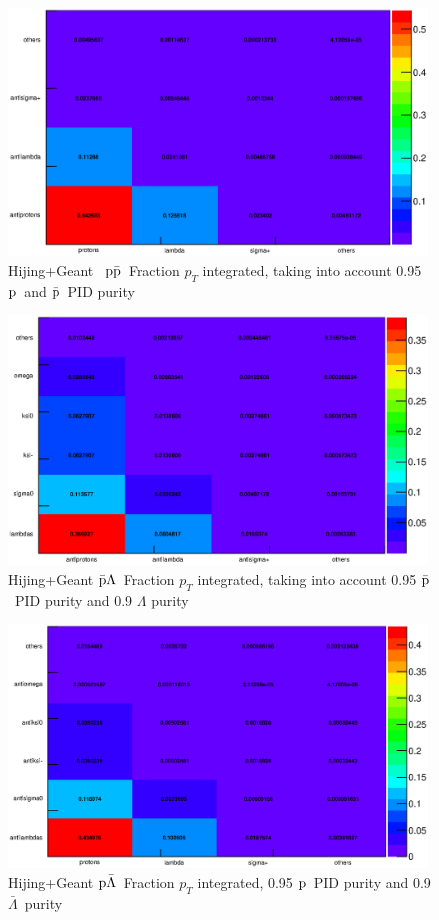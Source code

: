 \documentclass[ALICE,manyauthors]{ALICE_analysis_notes}
\newcommand{\pap}{$\rm p\bar{\rm p}$}
\newcommand{\pal}{$\rm p\bar{\rm \Lambda}$}
\newcommand{\apl}{$\bar{\rm p }\Lambda$}
\newcommand{\ap}{$\bar{\rm p }$}
\newcommand{\p}{$\rm p $}
\newcommand{\aL}{$\bar{\Lambda}$}
\begin{document}
 \begin{figure}[h!]
   \centering
   \includegraphics[width=0.99\textwidth]{pics/papFraction}
   \caption{Hijing+Geant ~\pap~Fraction $p_T$ integrated, taking into account 0.95 \p~and \ap~PID purity}
   \label{fig:papFraction}
 \end{figure}

 \begin{figure}[h!]
   \centering
   \includegraphics[width=0.99\textwidth]{pics/aplFraction}
   \caption{Hijing+Geant \apl~Fraction $p_T$ integrated, taking into account 0.95 \ap~PID purity and 0.9 $\Lambda$ purity}
   \label{fig:aplFraction}
 \end{figure}

 \begin{figure}[h!]
   \centering
   \includegraphics[width=0.99\textwidth]{pics/palFraction}
   \caption{Hijing+Geant \pal~Fraction $p_T$ integrated, 0.95 \p~PID purity and 0.9 \aL~purity}
   \label{fig:palFraction}
 \end{figure}
\end{document}
